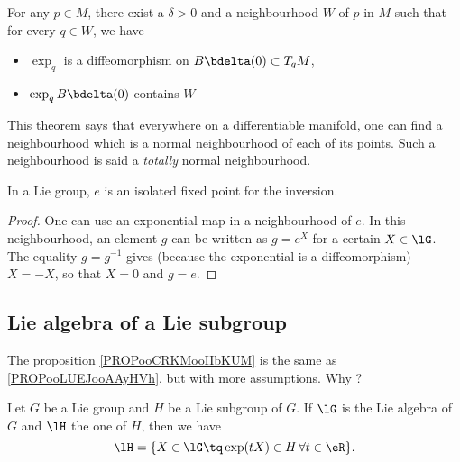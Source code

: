 \begin{theorem}
For any $p\in M$, there exist a $\delta>0$ and a neighbourhood $W$ of $p$ in $M$ such that for every $q\in W$, we have

\begin{itemize}
\item $\exp_q$ is a diffeomorphism on $B\bdelta(0)\subset T_qM$,
\item $\exp_q B\bdelta(0)$ contains $W$
\end{itemize}
\end{theorem}
This theorem says that everywhere on a differentiable manifold, one can find a neighbourhood which is a normal neighbourhood of each of its points. Such a neighbourhood is said a \emph{totally} normal neighbourhood.

\begin{lemma}
In a Lie group, $e$ is an isolated fixed point for the inversion.
\end{lemma}

\begin{proof}
One can use an exponential map in a neighbourhood of $e$. In this neighbourhood, an element $g$ can be written as $g=e^X$ for a certain $X\in\lG$. The equality $g=g^{-1}$ gives (because the exponential is a diffeomorphism) $X=-X$, so that $X=0$ and $g=e$.
\end{proof}

\subsection{Lie algebra of a Lie subgroup}

\begin{probleme}
    The proposition \ref{PROPooCRKMooIIbKUM} is the same as \ref{PROPooLUEJooAAyHVh}, but with more assumptions. Why ?
\end{probleme}

\begin{proposition}       \label{PROPooLUEJooAAyHVh}
    Let \( G\) be a Lie group and \( H\) be a Lie subgroup of \( G\). If \( \lG\) is the Lie algebra of \( G\) and \( \lH\) the one of \( H\), then we have
    \begin{equation}
        \lH=\{ X\in \lG\tq \exp(tX)\in H\,\forall t\in \eR \}.
    \end{equation}
\end{proposition}

